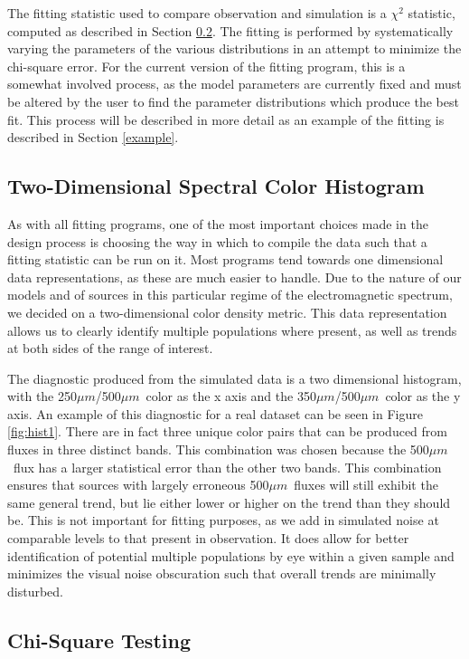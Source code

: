\documentclass[twocolumn,letterpaper,10pt]{article}
\def \um {$\mu m$}
\begin{document}
The fitting statistic used to compare observation and simulation is a $\chi^2$ statistic, computed as described in Section \ref{chisq}. The fitting is performed by systematically varying the parameters of the various distributions in an attempt to minimize the chi-square error. For the current version of the fitting program, this is a somewhat involved process, as the model parameters are currently fixed and must be altered by the user to find the parameter distributions which produce the best fit. This process will be described in more detail as an example of the fitting is described in Section \ref{example}.

\subsection{Two-Dimensional Spectral Color Histogram}\label{color_hist}

As with all fitting programs, one of the most important choices made in the design process is choosing the way in which to compile the data such that a fitting statistic can be run on it. Most programs tend towards one dimensional data representations, as these are much easier to handle. Due to the nature of our models and of sources in this particular regime of the electromagnetic spectrum, we decided on a two-dimensional color density metric. This data representation allows us to clearly identify multiple populations where present, as well as trends at both sides of the range of interest.

The diagnostic produced from the simulated data is a two dimensional histogram, with the 250\um/500\um\ color as the x axis and the 350\um/500\um\ color as the y axis. An example of this diagnostic for a real dataset can be seen in Figure \ref{fig:hist1}. There are in fact three unique color pairs that can be produced from fluxes in three distinct bands. This combination was chosen because the 500\um\ flux has a larger statistical error than the other two bands. This combination ensures that sources with largely erroneous 500\um\ fluxes will still exhibit the same general trend, but lie either lower or higher on the trend than they should be. This is not important for fitting purposes, as we add in simulated noise at comparable levels to that present in observation. It does allow for better identification of potential multiple populations by eye within a given sample and minimizes the visual noise obscuration such that overall trends are minimally disturbed.

\subsection{Chi-Square Testing}\label{chisq}
\end{document}
